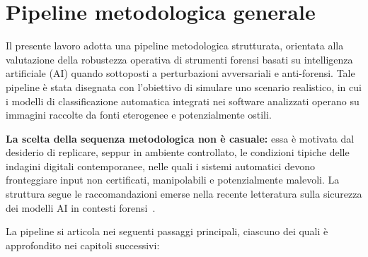\section{Pipeline metodologica generale} \label{chap:pipeline}

Il presente lavoro adotta una pipeline metodologica strutturata, orientata alla valutazione della robustezza operativa di strumenti forensi basati su intelligenza artificiale (AI) quando sottoposti a perturbazioni avversariali e anti-forensi. Tale pipeline è stata disegnata con l'obiettivo di simulare uno scenario realistico, in cui i modelli di classificazione automatica integrati nei software analizzati operano su immagini raccolte da fonti eterogenee e potenzialmente ostili.

\textbf{La scelta della sequenza metodologica non è casuale:} essa è motivata dal desiderio di replicare, seppur in ambiente controllato, le condizioni tipiche delle indagini digitali contemporanee, nelle quali i sistemi automatici devono fronteggiare input non certificati, manipolabili e potenzialmente malevoli. La struttura segue le raccomandazioni emerse nella recente letteratura sulla sicurezza dei modelli AI in contesti forensi~\cite{barni2020forensics, nowroozi2020presentation, costantini2019digital}.

La pipeline si articola nei seguenti passaggi principali, ciascuno dei quali è approfondito nei capitoli successivi:

